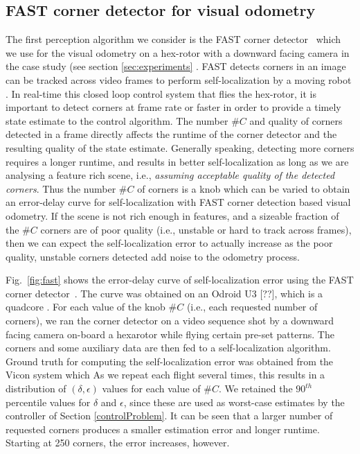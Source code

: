 \subsection{FAST corner detector for visual odometry}

The first perception algorithm we consider is the FAST corner detector~\cite{rosten_2006_machine} which we use for the visual odometry on a hex-rotor with a downward facing camera in the case study (see section \ref{sec:experiments} .
FAST detects corners in an image can be tracked across video frames to perform self-localization by a moving robot \cite{}. 
In real-time this closed loop control system that flies the hex-rotor, it is important to detect corners at frame rate or faster in order to provide a timely state estimate to the control algorithm.
The number $\#C$ and quality of corners detected in a frame directly affects the runtime of the corner detector and the resulting quality of the state estimate. Generally speaking, detecting more corners requires a longer runtime, and results in better self-localization as long as we are analysing a feature rich scene, i.e., \emph{assuming acceptable quality of the detected corners}. Thus the number $\#C$ of corners is a knob which can be varied to obtain an error-delay curve for self-localization with FAST corner detection based visual odometry. 
If the scene is not rich enough in features, and a sizeable fraction of the $\#C$ corners are of poor quality (i.e., unstable or hard to track across frames), then we can expect the self-localization error to actually increase as the poor quality, unstable corners detected add noise to the odometry process. 


Fig.~\ref{fig:fast} shows the error-delay curve of self-localization error using the FAST corner detector~\cite{rosten_2006_machine}.
The curve was obtained on an Odroid U3 [??], which is a quadcore .
For each value of the knob $\#C$ (i.e., each requested number of corners), we ran the corner detector on a video sequence shot by a downward facing camera on-board a hexarotor while flying certain pre-set patterns.
The corners and some auxiliary data are then fed to a self-localization algorithm.
Ground truth for computing the self-localization error was obtained from the Vicon system which 
As we repeat each flight several times, this results in a distribution of $(\delta,\epsilon)$ values for each value of $\#C$. 
We retained the $90^{th}$ percentile values for $\delta$ and $\epsilon$, since these are used as worst-case estimates by the controller of Section \ref{controlProblem}.
It can be seen that a larger number of requested corners produces a smaller estimation error and longer runtime.
Starting at 250 corners, the error increases, however. 

